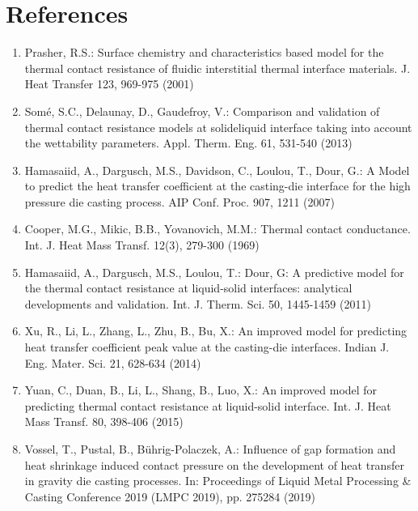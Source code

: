 \documentclass[10pt]{article}
\begin{document}
\section*{References}
\begin{enumerate}
  \item Prasher, R.S.: Surface chemistry and characteristics based model for the thermal contact resistance of fluidic interstitial thermal interface materials. J. Heat Transfer 123, 969-975 (2001)

  \item Somé, S.C., Delaunay, D., Gaudefroy, V.: Comparison and validation of thermal contact resistance models at solideliquid interface taking into account the wettability parameters. Appl. Therm. Eng. 61, 531-540 (2013)

  \item Hamasaiid, A., Dargusch, M.S., Davidson, C., Loulou, T., Dour, G.: A Model to predict the heat transfer coefficient at the casting-die interface for the high pressure die casting process. AIP Conf. Proc. 907, 1211 (2007)

  \item Cooper, M.G., Mikic, B.B., Yovanovich, M.M.: Thermal contact conductance. Int. J. Heat Mass Transf. 12(3), 279-300 (1969)

  \item Hamasaiid, A., Dargusch, M.S., Loulou, T.: Dour, G: A predictive model for the thermal contact resistance at liquid-solid interfaces: analytical developments and validation. Int. J. Therm. Sci. 50, 1445-1459 (2011)

  \item Xu, R., Li, L., Zhang, L., Zhu, B., Bu, X.: An improved model for predicting heat transfer coefficient peak value at the casting-die interfaces. Indian J. Eng. Mater. Sci. 21, 628-634 (2014)

  \item Yuan, C., Duan, B., Li, L., Shang, B., Luo, X.: An improved model for predicting thermal contact resistance at liquid-solid interface. Int. J. Heat Mass Transf. 80, 398-406 (2015)

  \item Vossel, T., Pustal, B., Bührig-Polaczek, A.: Influence of gap formation and heat shrinkage induced contact pressure on the development of heat transfer in gravity die casting processes. In: Proceedings of Liquid Metal Processing \& Casting Conference 2019 (LMPC 2019), pp. 275284 (2019)

\end{enumerate}
\end{document}
